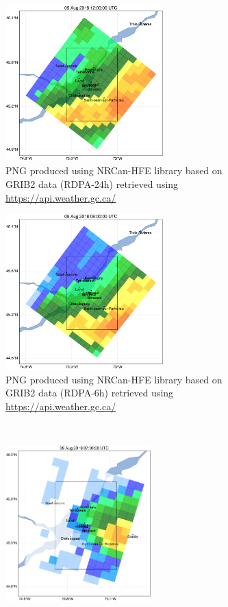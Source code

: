 \documentclass[10pt,a4paper,titlepage,parskip]{scrartcl}
\begin{document}
\begin{figure}[h!]
	\begin{subfigure}[a]{0.5\textwidth}
		\centering
		\includegraphics[height=6cm]{figures/test-map-geomet-nrcan-hfe-rdpa24_2018080912.png}
		\caption{PNG produced using NRCan-HFE library based on GRIB2 data (RDPA-24h) retrieved using \url{https://api.weather.gc.ca/}}
		\label{fig:plot_example:api-weather:24h}
	\end{subfigure}
	\hspace*{0.02\textwidth}
	\begin{subfigure}[a]{0.5\textwidth}
		\centering
		\includegraphics[height=6cm]{figures/test-map-geomet-nrcan-hfe-rdpa6_2018080906.png}
		\caption{PNG produced using NRCan-HFE library based on GRIB2 data (RDPA-6h) retrieved using \url{https://api.weather.gc.ca/}}
		\label{fig:plot_example:api-weather:6h}
	\end{subfigure}\\
	\begin{subfigure}[a]{0.5\textwidth}
		\centering
		\includegraphics[height=6cm]{figures/test-map-caspar-nrcan-hfe_2018080907.png}

\end{subfigure}
\end{figure}
\end{document}
